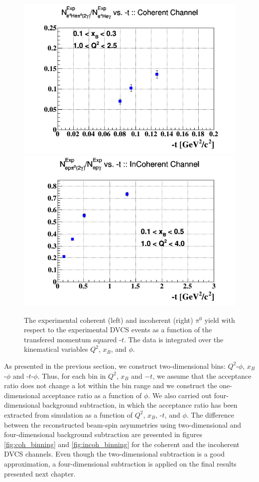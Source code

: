 \begin{figure}[tpb]
\includegraphics[scale=0.37]{fig_updated/T_ratio_pi0_dvcs_Coh_t.png}
\includegraphics[scale=0.37]{fig_updated/T_ratio_pi0_dvcs_InCoh_t.png}
\caption{The experimental coherent (left) and incoherent (right) $\pi^{0}$ 
yield with respect to the experimental DVCS events as a function of the 
transfered momentum squared -$t$. The data is integrated over the kinematical 
variables $Q^2$, $x_B$, and $\phi$.  }
\label{fig:cont_yield}
\end{figure}





As presented in the previous section, we construct two-dimensional bins: 
$Q^2$-$\phi$, $x_B$-$\phi$ and -$t$-$\phi$. Thus, for each bin in $Q^2$, $x_B$ 
and $-t$, we assume that the acceptance ratio does not change a lot within the 
bin range and we construct the one-dimensional acceptance ratio as a function 
of $\phi$. We also carried out four-dimensional background subtraction, in 
which the acceptance ratio has been extracted from simulation as a function of 
$Q^2$, $x_B$, -$t$, and $\phi$. The difference between the reconstructed 
beam-spin asymmetries using two-dimensional and four-dimensional background 
subtraction are presented in figures \ref{fig:coh_binning} and 
\ref{fig:incoh_binning} for the coherent and the incoherent DVCS channels.  
Even though the two-dimensional subtraction is a good approximation, a 
four-dimensional subtraction is applied on the final results presented next 
chapter. 

